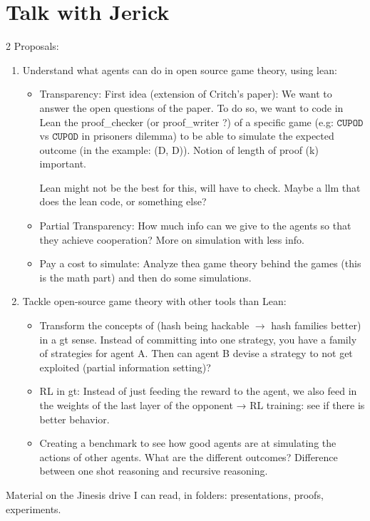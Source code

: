 \documentclass{article}
\newcommand{\cupod}{\texttt{CUPOD}}
\begin{document}
\section{Talk with Jerick}
2 Proposals: 
\begin{enumerate}
    \item Understand what agents can do in open source game theory, using lean:
    \begin{itemize}
        \item Transparency: First idea (extension of Critch's paper): We want to answer the open questions of the paper. To do so, we want to code in Lean the proof\_checker (or proof\_writer ?) of a specific game (e.g: $\cupod$ vs $\cupod$ in prisoners dilemma) to be able to simulate the expected outcome (in the example: (D, D)). Notion of length of proof (k) important.
        
        Lean might not be the best for this, will have to check. Maybe a llm that does the lean code, or something else?      
        
        \item Partial Transparency: How much info can we give to the agents so that they achieve cooperation? More on simulation with less info.
        \item Pay a cost to simulate: Analyze thea game theory behind the games (this is the math part) and then do some simulations.
    \end{itemize}
    \item Tackle open-source game theory with other tools than Lean:
    \begin{itemize}
    \item Transform the concepts of (hash being hackable $\to$ hash families better) in a gt sense.
    Instead of committing into one strategy, you have a family of strategies for agent A. Then can agent B devise a strategy to not get exploited (partial information setting)?
    \item RL in gt: Instead of just feeding the reward to the agent, we also feed in the weights of the last layer of the opponent → RL training: see if there is better behavior.
    \item Creating a benchmark to see how good agents are at simulating the actions of other agents. What are the different outcomes? Difference between one shot reasoning and recursive reasoning.
\end{itemize}
\end{enumerate}


Material on the Jinesis drive I can read, in folders: presentations, proofs, experiments.
\end{document}
